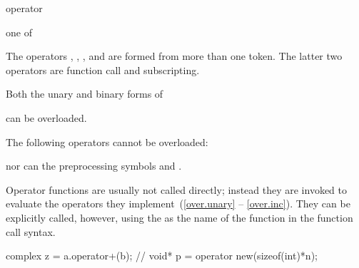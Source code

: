\begin{bnf}
\br
     operator
\end{bnf}

\begin{bnf}
\obeyspaces
{} \textnormal{one of}\br
    \br
    \terminal{\~        !        +        -        *        /        \%        \caret{}        \&}\br
    \terminal{|        =        +=       -=       *=       /=       \%=       \caret{}=       \&=}\br
    \terminal{|=       ==       !=       <        >        <=       >=       <=>      \&\&}\br
    \terminal{||       <<       >>       <<=      >>=      ++       --       ,}\br
\end{bnf}
\begin{note}
The operators
,
,
\tcode{()},
and
\tcode{[]}
are formed from more than one token.
The latter two operators are function call
and subscripting.
\end{note}
%
%

\pnum
Both the unary and binary forms of
\begin{ncsimplebnf}\obeyspaces
\terminal{+      -      *      \&}
\end{ncsimplebnf}
can be overloaded.

\pnum
{}%
The following operators cannot be overloaded:
\begin{ncsimplebnf}\obeyspaces
{}
\end{ncsimplebnf}
nor can the preprocessing symbols
\tcode{\#}
and
\tcode{\#\#}.

\pnum
{}%
Operator functions are usually not called directly; instead they are invoked
to evaluate the operators they implement~(\ref{over.unary} -- \ref{over.inc}).
They can be explicitly called, however, using the
as the name of the function in the function call syntax.
\begin{example}

\begin{codeblock}
complex z = a.operator+(b);     // 
void* p = operator new(sizeof(int)*n);
\end{codeblock}
\end{example}


